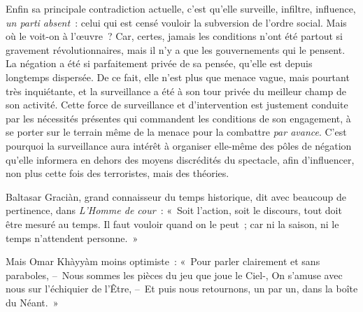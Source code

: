 \documentclass[french,twoside]{book} %
\def\mednobreak{\ifdim\lastskip<\medskipamount
  \removelastskip\nopagebreak\medskip\fi}
\newcommand{\labelblock}[1]{\medbreak{\noindent\color{rubric}\bfseries #1}\par\mednobreak}
\begin{document}
Enfin sa principale contradiction actuelle, c’est qu’elle surveille, infiltre, influence, \emph{un parti absent} : celui qui est censé vouloir la subversion de l’ordre social. Mais où le voit-on à l’œuvre ? Car, certes, jamais les conditions n’ont été partout si gravement révolutionnaires, mais il n’y a que les gouvernements qui le pensent. La négation a été si parfaitement privée de sa pensée, qu’elle est depuis longtemps dispersée. De ce fait, elle n’est plus que menace vague, mais pourtant très inquiétante, et la surveillance a été à son tour privée du meilleur champ de son activité. Cette force de surveillance et d’intervention est justement conduite par les nécessités présentes qui commandent les conditions de son engagement, à se porter sur le terrain même de la menace pour la combattre \emph{par avance}. C’est pourquoi la surveillance aura intérêt à organiser elle-même des pôles de négation qu’elle informera en dehors des moyens discrédités du spectacle, afin d’influencer, non plus cette fois des terroristes, mais des théories.\par

\labelblock{XXXI}

\noindent Baltasar Graciàn, grand connaisseur du temps historique, dit avec beaucoup de pertinence, dans \emph{L’Homme de cour} : « Soit l’action, soit le discours, tout doit être mesuré au temps. Il faut vouloir quand on le peut ; car ni la saison, ni le temps n’attendent personne. »\par
Mais Omar Khàyyàm moins optimiste : « Pour parler clairement et sans paraboles, – Nous sommes les pièces du jeu que joue le Ciel-, On s’amuse avec nous sur l’échiquier de l’Être, – Et puis nous retournons, un par un, dans la boîte du Néant. »\par

\labelblock{XXXII}
\end{document}
